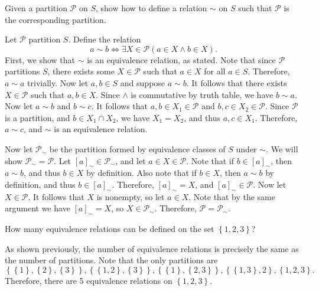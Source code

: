 \documentclass[11pt]{report}
\begin{document}
\begin{exercise}
	Given a partition $\mathscr{P} $ on $S$, show how to define a relation $\sim $ on $S$ such that $\mathscr{P} $ is the corresponding partition.
\end{exercise}
\begin{solution}
	Let $\mathscr{P} $ partition $S$. Define the relation
	\[
		a\sim b \iff \exists X\in \mathscr{P} \left( a\in X \land b\in X \right) 
	.\]
	First, we show that $\sim $ is an equivalence relation, as stated. Note that since $\mathscr{P} $ partitions $S$, there exists some $X\in \mathscr{P} $ such that $a\in X$ for all $a\in S$. Therefore, $a\sim a$ trivially. Now let $a,b\in S$ and suppose $a\sim b$. It follows that there exists $X\in \mathscr{P} $ such that $a,b\in X$. Since $\land $ is commutative by truth table, we have $b\sim a$. Now let $a\sim b$ and $b\sim c$. It follows that $a,b\in X_1\in \mathscr{P} $ and $b,c\in X_2\in \mathscr{P} $. Since $\mathscr{P} $ is a partition, and $b\in X_1\cap X_2$, we have $X_1=X_2$, and thus $a,c\in X_1$. Therefore, $a\sim c$, and $\sim $ is an equivalence relation.

	Now let $\mathscr{P}_\sim $ be the partition formed by equivalence classes of $S$ under $\sim $. We will show $\mathscr{P} _\sim =\mathscr{P} $. Let $[a]_\sim \in \mathscr{P} _\sim $, and let $a\in X\in \mathscr{P} $. Note that if $b\in [a]_\sim $, then $a\sim b$, and thus $b\in X$ by definition. Also note that if $b\in X$, then $a\sim b$ by definition, and thus $b\in [a]_\sim $. Therefore, $[a]_\sim =X$, and $[a]_\sim \in \mathscr{P} $. Now let $X\in \mathscr{P} $. It follows that $X$ is nonempty, so let $a\in X$. Note that by the same argument we have $[a]_\sim =X$, so $X\in \mathscr{P} _{\sim }$. Therefore, $\mathscr{P} =\mathscr{P} _\sim $.
\end{solution}
\begin{exercise}
	How many equivalence relations can be defined on the set $\left\{ 1,2,3 \right\} $?
\end{exercise}
\begin{solution}
	As shown previously, the number of equivalence relations is precisely the same as the number of partitions. Note that the only partitions are
	\[
		\left\{ \left\{ 1 \right\} ,\left\{ 2 \right\} ,\left\{ 3 \right\}  \right\} ,\left\{ \left\{ 1,2 \right\} ,\left\{ 3 \right\}  \right\} ,\left\{ \left\{ 1 \right\} ,\left\{ 2,3 \right\}  \right\} ,\left\{ \left\{ 1,3 \right\} ,2 \right\} ,\left\{ 1,2,3 \right\} 
	.\]
	Therefore, there are 5 equivalence relations on $\left\{ 1,2,3 \right\} $.
\end{solution}
\end{document}

